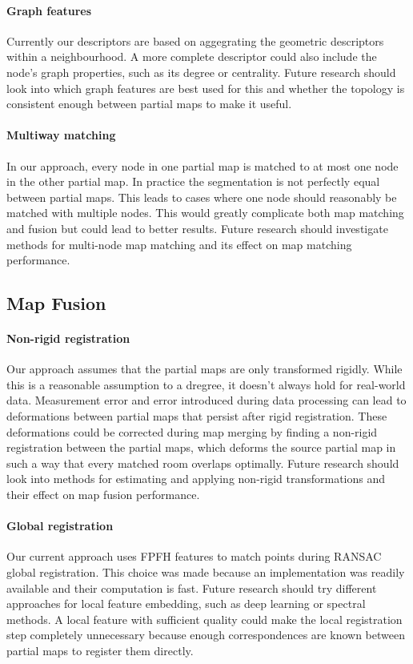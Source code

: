 \paragraph{Graph features}
Currently our descriptors are based on aggegrating the geometric descriptors within a neighbourhood. A more complete descriptor could also include the node's graph properties, such as its degree or centrality. Future research should look into which graph features are best used for this and whether the topology is consistent enough between partial maps to make it useful.

\paragraph{Multiway matching}
In our approach, every node in one partial map is matched to at most one node in the other partial map. In practice the segmentation is not perfectly equal between partial maps. This leads to cases where one node should reasonably be matched with multiple nodes. This would greatly complicate both map matching and fusion but could lead to better results. Future research should investigate methods for multi-node map matching and its effect on map matching performance.

\subsection{Map Fusion}

\paragraph{Non-rigid registration}
Our approach assumes that the partial maps are only transformed rigidly. While this is a reasonable assumption to a dregree, it doesn't always hold for real-world data. Measurement error and error introduced during data processing can lead to deformations between partial maps that persist after rigid registration. These deformations could be corrected during map merging by finding a non-rigid registration between the partial maps, which deforms the source partial map in such a way that every matched room overlaps optimally. Future research should look into methods for estimating and applying non-rigid transformations and their effect on map fusion performance.

\paragraph{Global registration}
Our current approach uses FPFH features to match points during RANSAC global registration. This choice was made because an implementation was readily available and their computation is fast. Future research should try different approaches for local feature embedding, such as deep learning or spectral methods. A local feature with sufficient quality could make the local registration step completely unnecessary because enough correspondences are known between partial maps to register them directly.

